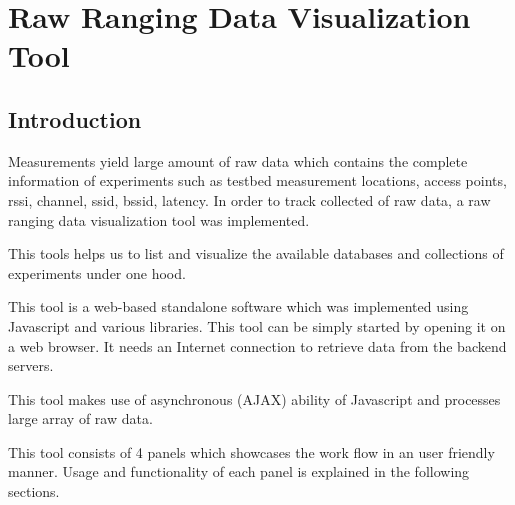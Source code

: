 \documentclass[11pt,a4paper,headinclude,footinclude,chapterprefix=on]{scrreprt}
\begin{document}
\chapter{Raw Ranging Data Visualization Tool}
\section*{Introduction} 
Measurements yield large amount of raw data which contains the complete information of experiments such as testbed measurement locations, access points, rssi, channel, ssid, bssid, latency. In order to track collected of raw data, a raw ranging data visualization tool was implemented. 

This tools helps us to list and visualize the available databases and collections of experiments under one hood. 

This tool is a web-based standalone software which was implemented using Javascript and various libraries. This tool can be simply started by opening it on a web browser. It needs an Internet connection to retrieve data from the backend servers.

This tool makes use of asynchronous (AJAX) ability of Javascript and processes large array of raw data.

This tool consists of 4 panels which showcases the work flow in an user friendly manner. Usage and functionality of each panel is explained in the following sections.
 
\end{document}
